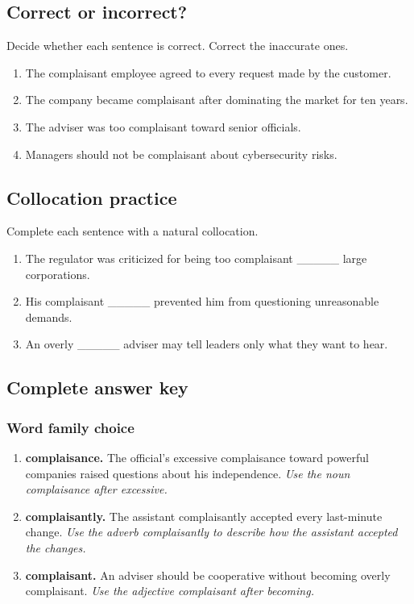 \documentclass[11pt]{article}
\begin{document}
\subsection{Correct or incorrect?}
Decide whether each sentence is correct. Correct the inaccurate ones.

\begin{enumerate}
  \item The complaisant employee agreed to every request made by the customer.
  \item The company became complaisant after dominating the market for ten years.
  \item The adviser was too complaisant toward senior officials.
  \item Managers should not be complaisant about cybersecurity risks.
\end{enumerate}

\subsection{Collocation practice}
Complete each sentence with a natural collocation.

\begin{enumerate}
  \item The regulator was criticized for being too complaisant \_\_\_\_\_ large corporations.
  \item His complaisant \_\_\_\_\_ prevented him from questioning unreasonable demands.
  \item An overly \_\_\_\_\_ adviser may tell leaders only what they want to hear.
\end{enumerate}

\subsection{Complete answer key}
\subsubsection{Word family choice}
\begin{enumerate}
  \item \textbf{complaisance.} The official's excessive complaisance toward powerful companies raised questions about his independence. \emph{Use the noun complaisance after excessive.}
  \item \textbf{complaisantly.} The assistant complaisantly accepted every last-minute change. \emph{Use the adverb complaisantly to describe how the assistant accepted the changes.}
  \item \textbf{complaisant.} An adviser should be cooperative without becoming overly complaisant. \emph{Use the adjective complaisant after becoming.}
\end{enumerate}
\end{document}

